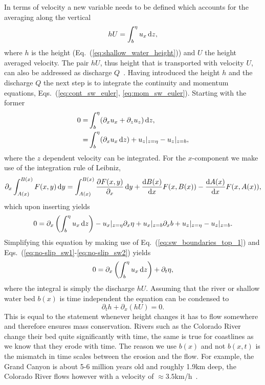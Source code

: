 In terms of velocity a new variable needs to be defined which accounts for the averaging along the vertical
\begin{equation}\label{eq:sw_discharge}
    hU = \int_{b}^{\eta}u_x\mathop{}\!\mathrm{d} z,
\end{equation}
where $h$ is the height (Eq.~(\ref{eq:shallow_water_height})) and $U$ the height averaged velocity. 
The pair $hU$, thus height that is transported with velocity $U$, can also be addressed as discharge $Q$~\cite{salmonLatticeBoltzmannMethod1999}.
Having introduced the height $h$ and the discharge $Q$ the next step is to integrate the continuity and momentum equations, Eqs.~(\ref{eq:cont_sw_euler}, \ref{eq:mom_sw_euler}). 
Starting with the former
\begin{align}
    0 =& \int_b^{\eta} (\partial_x u_x + \partial_z u_z) \mathop{}\!\mathrm{d} z, \label{eq:vert_int_cont_1}\\
    =& \int_b^{\eta} (\partial_x u_x \mathop{}\!\mathrm{d} z) + u_z|_{z = \eta} - u_z|_{z = b}, \label{eq:vert_int_cont_2}
\end{align}
 where the $z$ dependent velocity can be integrated. 
 For the $x$-component we make use of the integration rule of Leibniz, 
\begin{equation}\label{eq:int_leibniz}
    \partial_x\int_{A(x)}^{B(x)}F(x,y)\mathop{}\!\mathrm{d} y = \int_{A(x)}^{B(x)}\frac{\partial F(x,y)}{\partial_x} \mathop{}\!\mathrm{d} y + \frac{\mathop{}\!\mathrm{d} B(x)}{\mathop{}\!\mathrm{d} x}F(x,B(x)) - \frac{\mathop{}\!\mathrm{d} A(x)}{\mathop{}\!\mathrm{d} x} F(x, A(x)),
\end{equation}
which upon inserting yields
\begin{equation}\label{eq:vert_int_cont_3}
    0 = \partial_x\left(\int_{b}^{\eta} u_x \mathop{}\!\mathrm{d} z \right) - u_x|_{z=\eta}\partial_x\eta + u_x|_{z=b}\partial_x b + u_z|_{z = \eta}  - u_z|_{z = b}. 
\end{equation}
Simplifying this equation by making use of Eq.~(\ref{eq:sw_boundaries_top_1}) and Eqs.~(\ref{eq:no-slip_sw1}-\ref{eq:no-slip_sw2}) yields
\begin{equation}\label{eq:vert_int_cont_4}
    0 = \partial_x\left(\int_{b}^{\eta} u_x \mathop{}\!\mathrm{d} z \right) + \partial_t \eta,
\end{equation}
where the integral is simply the discharge $hU$. 
Assuming that the river or shallow water bed $b(x)$ is time independent the equation can be condensed to
\begin{equation}\label{eq:shallow_water_cont_true}
    \partial_t h + \partial_x(hU) = 0.
\end{equation} 
This is equal to the statement whenever height changes it has to flow somewhere and therefore ensures mass conservation. 
Rivers such as the Colorado River change their bed quite significantly with time, the same is true for coastlines as we know that they erode with time.
The reason we use $b(x)$ and not $b(x, t)$ is the mismatch in time scales between the erosion and the flow.
For example, the Grand Canyon is about 5-6 million years old and roughly 1.9km deep, the Colorado River flows however with a velocity of $\approx 3.5$km/h~\cite{grafColoradoRiverGrand1997}.

